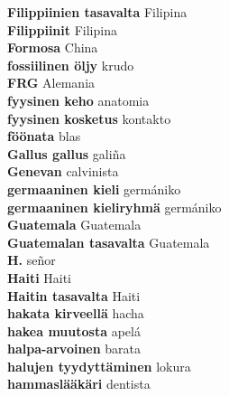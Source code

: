 \textbf{ Filippiinien tasavalta  } Filipina \\
\textbf{ Filippiinit  } Filipina \\
\textbf{ Formosa  } China \\
\textbf{ fossiilinen öljy  } krudo \\
\textbf{ FRG  } Alemania \\
\textbf{ fyysinen keho  } anatomia \\
\textbf{ fyysinen kosketus  } kontakto \\
\textbf{ föönata  } blas \\
\textbf{ Gallus gallus  } galiña \\
\textbf{ Genevan  } calvinista \\
\textbf{ germaaninen kieli  } germániko \\
\textbf{ germaaninen kieliryhmä  } germániko \\
\textbf{ Guatemala  } Guatemala \\
\textbf{ Guatemalan tasavalta  } Guatemala \\
\textbf{ H.  } señor \\
\textbf{ Haiti  } Haiti \\
\textbf{ Haitin tasavalta  } Haiti \\
\textbf{ hakata kirveellä  } hacha \\
\textbf{ hakea muutosta  } apelá \\
\textbf{ halpa-arvoinen  } barata \\
\textbf{ halujen tyydyttäminen  } lokura \\
\textbf{ hammaslääkäri  } dentista \\
